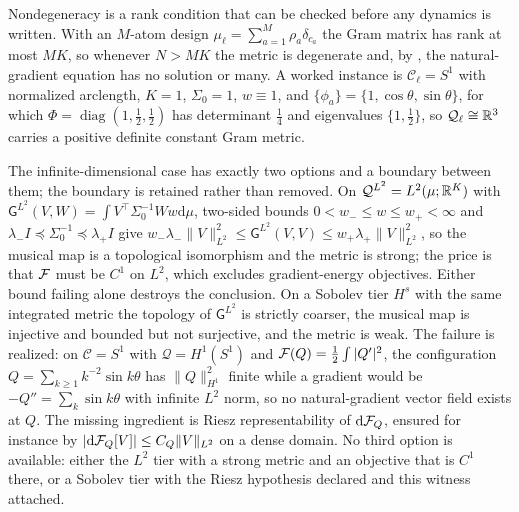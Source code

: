 Nondegeneracy is a rank condition that can be checked before any dynamics is
written.  With an $M$-atom design $\mu_\ell=\sum_{a=1}^M\rho_a\delta_{c_a}$ the
Gram matrix has rank at most $MK$, so whenever $N>MK$ the metric is degenerate
and, by , the natural-gradient
equation has no solution or many.  A worked instance is
$\mathcal C_\ell=S^1$ with normalized arclength, $K=1$, $\Sigma_0=1$,
$w\equiv1$, and $\{\phi_a\}=\{1,\cos\theta,\sin\theta\}$, for which
$\Phi=\operatorname{diag}(1,\tfrac12,\tfrac12)$ has determinant $\tfrac14$ and
eigenvalues $\{1,\tfrac12\}$, so $\mathcal Q_\ell\cong\mathbb R^3$ carries a positive
definite constant Gram metric.  

The infinite-dimensional case has exactly two options and a boundary between
them; the boundary is retained rather than removed.  On
$\mathcal Q^{L^2}=L^2(\mu;\mathbb R^K)$ with
$\mathsf G^{L^2}(V,W)=\int V^\top\Sigma_0^{-1}Ww\mathrm d\mu$, two-sided bounds
$0<w_-\leq w\leq w_+<\infty$ and
$\lambda_-I\preceq\Sigma_0^{-1}\preceq\lambda_+I$ give
$w_-\lambda_-\lVert V\rVert^2_{L^2}
\leq\mathsf G^{L^2}(V,V)\leq w_+\lambda_+\lVert V\rVert^2_{L^2}$, so the musical
map is a topological isomorphism and the metric is strong; the price is that
$\mathcal F$ must be $C^1$ on $L^2$, which excludes gradient-energy objectives.
Either bound failing alone destroys the conclusion.  On a Sobolev tier
$H^s$ with the same integrated metric the topology of $\mathsf G^{L^2}$ is
strictly coarser, the musical map is injective and bounded but not surjective,
and the metric is weak.  The failure is realized: on $\mathcal C=S^1$ with
$\mathcal Q=H^1(S^1)$ and $\mathcal F(Q)=\tfrac12\int|Q'|^2$, the configuration
$Q=\sum_{k\geq1}k^{-2}\sin k\theta$ has $\lVert Q\rVert^2_{H^1}$ finite while a
gradient would be $-Q''=\sum_k\sin k\theta$ with infinite $L^2$ norm, so no
natural-gradient vector field exists at $Q$.  The missing ingredient is Riesz
representability of $\mathrm d\mathcal F_Q$, ensured for instance by
$|\mathrm d\mathcal F_Q[V]|\leq C_Q\lVert V\rVert_{L^2}$ on a dense domain.  No
third option is available: either the $L^2$ tier with a strong metric and an
objective that is $C^1$ there, or a Sobolev tier with the Riesz hypothesis
declared and this witness attached.  

